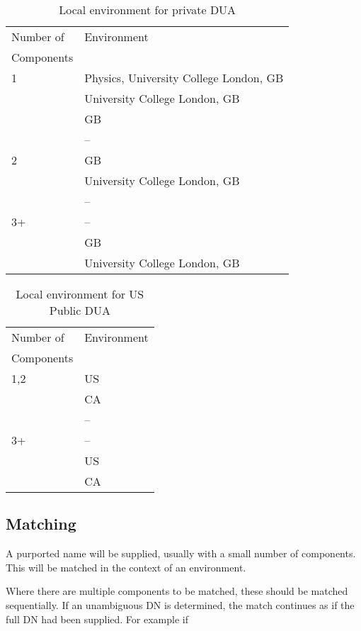 \begin{table}
\begin{center}
\begin{tabular}{l l}
Number of & Environment \\
Components & \\
\hline
1 & Physics, University College London, GB  \\
& University College London, GB \\
& GB  \\
& -- \\
\hline
2 & GB  \\
& University College London, GB \\
& -- \\
\hline
3+  & -- \\
& GB  \\
& University College London, GB \\

\end{tabular}
\end{center}
\caption {Local environment for private DUA}
\label{e1}
\end{table}

\begin{table}
\begin{center}
\begin{tabular}{l l}
Number of & Environment \\
Components & \\
\hline
1,2  & US  \\
& CA \\
& -- \\
\hline
3+ & -- \\
& US \\
& CA \\
\end{tabular}
\end{center}
\caption {Local environment for US Public DUA}
\label{e2}
\end{table}


\subsection {Matching}


A purported name will be supplied, usually with a small number of components.
This will be matched in the context of an environment.

Where there are multiple components to be matched, these should be matched
sequentially.  If an unambiguous DN is determined, the match continues as if
the full DN had been supplied.  
For example if 

